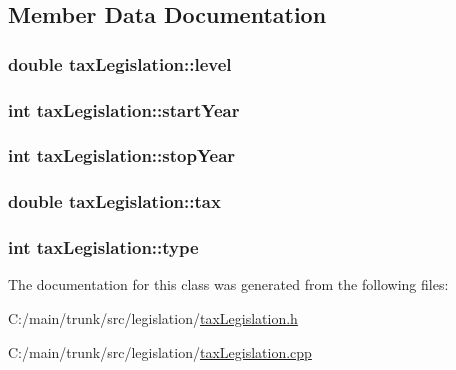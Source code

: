 \subsection{Member Data Documentation}
\hypertarget{classtax_legislation_a6a3416e30e2b2a7ee0053792a688f21c}{
\subsubsection[{level}]{\setlength{\rightskip}{0pt plus 5cm}double {\bf taxLegislation::level}}}
\label{classtax_legislation_a6a3416e30e2b2a7ee0053792a688f21c}
\hypertarget{classtax_legislation_adbbadff2de7874d7791a8b49184efa20}{
\subsubsection[{startYear}]{\setlength{\rightskip}{0pt plus 5cm}int {\bf taxLegislation::startYear}}}
\label{classtax_legislation_adbbadff2de7874d7791a8b49184efa20}
\hypertarget{classtax_legislation_af30a4ad86468d2d3e2e5916f8fec7c70}{
\subsubsection[{stopYear}]{\setlength{\rightskip}{0pt plus 5cm}int {\bf taxLegislation::stopYear}}}
\label{classtax_legislation_af30a4ad86468d2d3e2e5916f8fec7c70}
\hypertarget{classtax_legislation_adb4fa60260aacf3c1a45a70bd3ae04bc}{
\subsubsection[{tax}]{\setlength{\rightskip}{0pt plus 5cm}double {\bf taxLegislation::tax}}}
\label{classtax_legislation_adb4fa60260aacf3c1a45a70bd3ae04bc}
\hypertarget{classtax_legislation_a0a6871fcffb1f92c0d5b8ae779c44513}{
\subsubsection[{type}]{\setlength{\rightskip}{0pt plus 5cm}int {\bf taxLegislation::type}}}
\label{classtax_legislation_a0a6871fcffb1f92c0d5b8ae779c44513}


The documentation for this class was generated from the following files:\begin{DoxyCompactItemize}
\item 
C:/main/trunk/src/legislation/\hyperlink{tax_legislation_8h}{taxLegislation.h}\item 
C:/main/trunk/src/legislation/\hyperlink{tax_legislation_8cpp}{taxLegislation.cpp}\end{DoxyCompactItemize}
